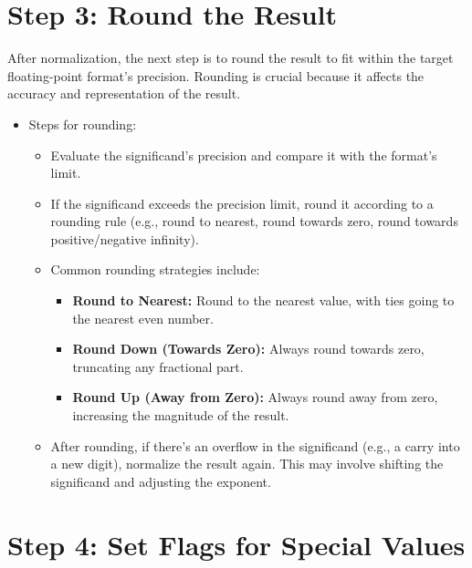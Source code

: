 \documentclass[12pt,openany, tikz,border=10pt]{book}
\begin{document}
			      	\section*{Step 3: Round the Result}
			      	
			      	After normalization, the next step is to round the result to fit within the target floating-point format's precision. Rounding is crucial because it affects the accuracy and representation of the result.
			      	    
			      	\begin{itemize}
			      		\item[] Steps for rounding:
			      		      \begin{itemize}
			      		      	\item Evaluate the significand's precision and compare it with the format's limit.
			      		      	\item If the significand exceeds the precision limit, round it according to a rounding rule (e.g., round to nearest, round towards zero, round towards positive/negative infinity).
			      		      	\item Common rounding strategies include:
			      		      	      \begin{itemize}
			      		      	      	\item \textbf{Round to Nearest:} Round to the nearest value, with ties going to the nearest even number.
			      		      	      	\item \textbf{Round Down (Towards Zero):} Always round towards zero, truncating any fractional part.
			      		      	      	\item \textbf{Round Up (Away from Zero):} Always round away from zero, increasing the magnitude of the result.
			      		      	      \end{itemize}
			      		      	\item After rounding, if there's an overflow in the significand (e.g., a carry into a new digit), normalize the result again. This may involve shifting the significand and adjusting the exponent.
			      		      \end{itemize}
			      	\end{itemize}
			      	    
			      	\section*{Step 4: Set Flags for Special Values}
			      	    
\end{document}
